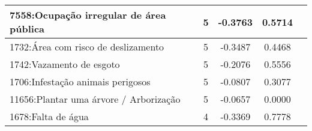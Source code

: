 \begin{table}[htbp]
\begin{tabular}{|l|c|c|c|c|}
		\hline
		7558:Ocupação irregular de área pública         & 5                & -0.3763        & 0.5714           \\
		\hline
		1732:Área com risco de deslizamento             & 5                & -0.3487        & 0.4468           \\
		\hline
		1742:Vazamento de esgoto                        & 5                & -0.2076        & 0.5556           \\
		\hline
		1706:Infestação animais perigosos               & 5                & -0.0807        & 0.3077           \\
		\hline
		11656:Plantar uma árvore / Arborização          & 5                & -0.0657        & 0.0000           \\
		\hline
		1678:Falta de água                              & 4                & -0.3369        & 0.7778           \\
		\hline
	\end{tabular}
\end{table}

